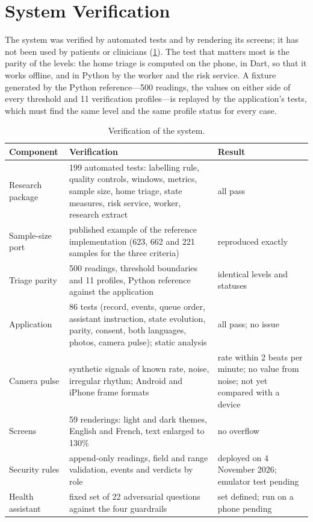 \documentclass[11pt,a4paper,oneside]{report}
\begin{document}
\section{System Verification}\label{sec:results-system}

The system was verified by automated tests and by rendering its screens; it has not been used by patients or clinicians (\cref{tab:verification}). The test that matters most is the parity of the levels: the home triage is computed on the phone, in Dart, so that it works offline, and in Python by the worker and the risk service. A fixture generated by the Python reference---500 readings, the values on either side of every threshold and 11 verification profiles---is replayed by the application's tests, which must find the same level and the same profile status for every case.

\begin{table}[htbp]
\centering\footnotesize
\caption{Verification of the system.}\label{tab:verification}
\begin{tabularx}{\textwidth}{@{}>{\raggedright\arraybackslash}p{3.4cm} X >{\raggedright\arraybackslash}p{3.3cm}@{}}
\toprule
\textbf{Component} & \textbf{Verification} & \textbf{Result} \\
\midrule
Research package & 199 automated tests: labelling rule, quality controls, windows, metrics, sample size, home triage, state measures, risk service, worker, research extract & all pass \\
Sample-size port & published example of the reference implementation (623, 662 and 221 samples for the three criteria) & reproduced exactly \\
Triage parity & 500 readings, threshold boundaries and 11 profiles, Python reference against the application & identical levels and statuses \\
Application & 86 tests (record, events, queue order, assistant instruction, state evolution, parity, consent, both languages, photos, camera pulse); static analysis & all pass; no issue \\
Camera pulse & synthetic signals of known rate, noise, irregular rhythm; Android and iPhone frame formats & rate within 2 beats per minute; no value from noise; not yet compared with a device \\
Screens & 59 renderings: light and dark themes, English and French, text enlarged to 130\% & no overflow \\
Security rules & append-only readings, field and range validation, events and verdicts by role & deployed on 4 November 2026; emulator test pending \\
Health assistant & fixed set of 22 adversarial questions against the four guardrails & set defined; run on a phone pending \\
\bottomrule
\end{tabularx}
\end{table}
\end{document}
